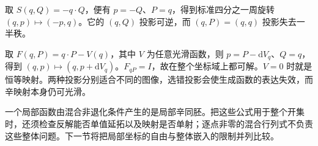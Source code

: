 \begin{example}\label{g4:exm:0804:two-projections}
	取 \(S(q,Q)=-q\cdot Q\)，便有 \(p=-Q\)、\(P=q\)，得到标准四分之一周旋转 \((q,p)\mapsto(-p,q)\)。它的 \((q,Q)\) 投影可逆，而 \((q,P)=(q,q)\) 投影失去一半秩。

	取 \(F(q,P)=q\cdot P-V(q)\)，其中 \(V\) 为任意光滑函数，则 \(p=P-\mathrm{d}V_q\)、\(Q=q\)，得到 \((q,p)\mapsto(q,p+\mathrm{d}V_q)\)。\(F_{qP}=I\)，故在整个坐标域上都可解。\(V=0\) 时就是恒等映射。两种投影分别适合不同的图像，选错投影会使生成函数的表达失效，而辛映射本身仍可光滑。
\end{example}

一个局部函数由混合非退化条件产生的是局部辛同胚。把这些公式用于整个开集时，还须检查反解能否单值延拓以及映射是否单射；逐点非零的混合行列式不负责这些整体问题。下一节将把局部坐标的自由与整体嵌入的限制并列比较。
